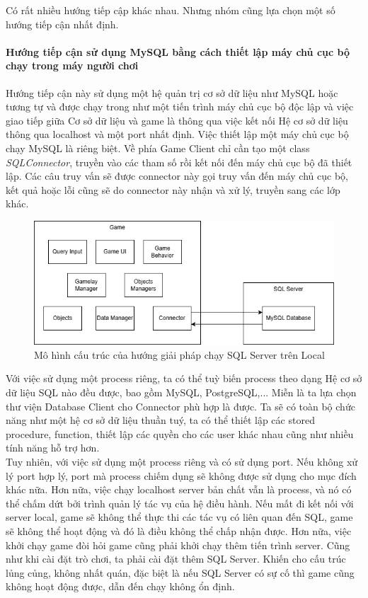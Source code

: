 \hspace*{0.5cm }Có rất nhiều hướng tiếp cập khác nhau. Nhưng nhóm cũng lựa chọn một số hướng tiếp cận nhất định.
\paragraph {Hướng tiếp cận sử dụng MySQL bằng cách thiết lập máy chủ cục bộ chạy trong máy người chơi}
\hspace*{0.5cm} Hướng tiếp cận này sử dụng một hệ quản trị cơ sở dữ liệu như MySQL hoặc tương tự và được chạy trong như một tiến trình máy chủ cục bộ độc lập và việc giao tiếp giữa Cơ sở dữ liệu và game là thông qua việc kết nối Hệ cơ sở dữ liệu thông qua localhost và một port nhất định. Việc thiết lập một máy chủ cục bộ chạy MySQL là riêng biệt. Về phía Game Client chỉ cần tạo một class \textit{SQLConnector}, truyền vào các tham số rồi kết nối đến máy chủ cục bộ đã thiết lập. Các câu truy vấn sẽ được connector này gọi truy vấn đến máy chủ cục bộ, kết quả hoặc lỗi cũng sẽ do connector này nhận và xử lý, truyền sang các lớp khác.\\
\begin{figure}[H]
	\centering
	\includegraphics[width=\textwidth]{Images/SQLLocalServer.png}
	\vspace{0.5cm}
	\caption{Mô hình cấu trúc của hướng giải pháp chạy SQL Server trên Local}
\end{figure}
\hspace*{0.5cm} Với việc sử dụng một process riêng, ta có thể tuỳ biến process theo dạng Hệ cơ sở dữ liệu SQL nào đều được, bao gồm MySQL, PostgreSQL,... Miễn là ta lựa chọn thư viện Database Client cho Connector phù hợp là được. Ta sẽ có toàn bộ chức năng như một hệ cơ sở dữ liệu thuần tuý, ta có thể thiết lập các stored procedure, function, thiết lập các quyền cho các user khác nhau cũng như nhiều tính năng hỗ trợ hơn.\\
\hspace*{0.5cm} Tuy nhiên, với việc sử dụng một process riêng và có sử dụng port. Nếu không xử lý port hợp lý, port mà process chiếm dụng sẽ không được sử dụng cho mục đích khác nữa. Hơn nữa, việc chạy localhost server bản chất vẫn là process, và nó có thể chấm dứt bởi trình quản lý tác vụ của hệ điều hành. Nếu mất đi kết nối với server local, game sẽ không thể thực thi các tác vụ có liên quan đến SQL, game sẽ không thể hoạt động và đó là điều không thể chấp nhận được. Hơn nữa, việc khởi chạy game đòi hỏi game cũng phải khởi chạy thêm tiến trình server. Cũng như khi cài đặt trò chơi, ta phải cài đặt thêm SQL Server. Khiến cho cấu trúc lủng củng, không nhất quán, đặc biệt là nếu SQL Server có sự cố thì game cũng không hoạt động được, dẫn đến chạy không ổn định.
